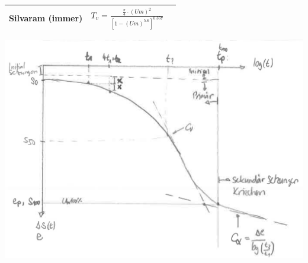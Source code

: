 \begin{minipage}{\linewidth}
\begin{tabular}{l|l|l}
	Silvaram
	(immer)		& $T_v=\frac{\frac{\pi}{4}\cdot (Um)^2}{\left[1-(Um)^{5.6}\right]^{0.357}}$ & \\	\hline	
	\end{tabular}

\vspace{\baselineskip}
\includegraphics[width=0.6\linewidth]{images/Kons4ZeitSetzungsDiagramm.PNG}
	\end{minipage}